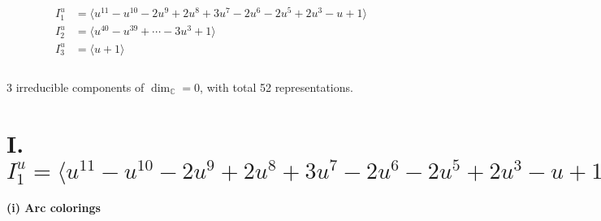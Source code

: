 \documentclass[1p]{elsarticle_modified}
\theoremstyle{definition}
\begin{document}
\begin{align*}
I^u_{1}&=\langle 
u^{11}- u^{10}-2 u^9+2 u^8+3 u^7-2 u^6-2 u^5+2 u^3- u+1\rangle \\
I^u_{2}&=\langle 
u^{40}- u^{39}+\cdots-3 u^3+1\rangle \\
I^u_{3}&=\langle 
u+1\rangle \\
\\
\end{align*}
\raggedright * 3 irreducible components of $\dim_{\mathbb{C}}=0$, with total 52 representations.\\
\newpage
\renewcommand{\arraystretch}{1}
\centering \section*{I. $I^u_{1}= \langle u^{11}- u^{10}-2 u^9+2 u^8+3 u^7-2 u^6-2 u^5+2 u^3- u+1 \rangle$}
\flushleft \textbf{(i) Arc colorings}\\
\end{document}
